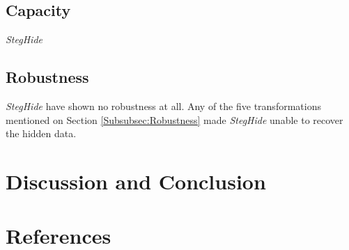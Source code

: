 \documentclass[11pt]{article}
\begin{document}
\subsection{Capacity}

\textit{StegHide} 


\subsection{Robustness}

\textit{StegHide} have shown no robustness at all. Any of the five transformations mentioned on Section \ref{Subsubsec:Robustness}
made \textit{StegHide} unable to recover the hidden data.

\section{Discussion and Conclusion}


\section{References}
\end{document}
